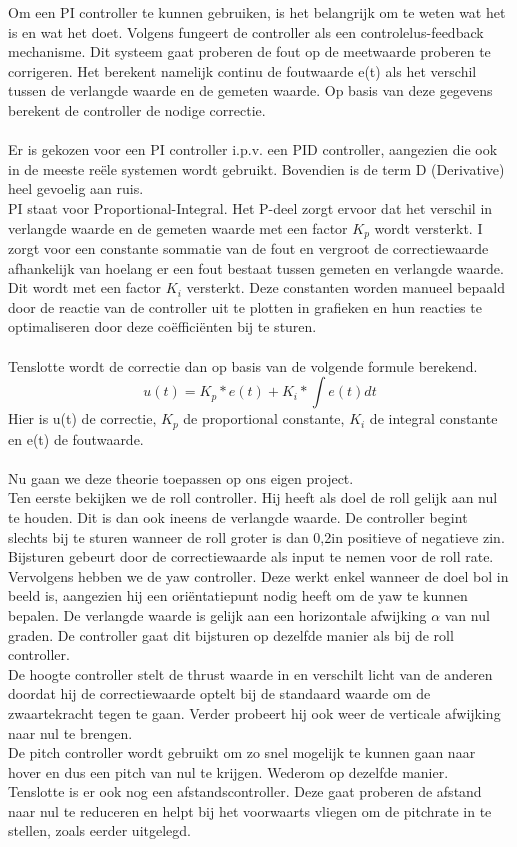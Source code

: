 \noindent
Om een PI controller te kunnen gebruiken, is het belangrijk om te weten wat het is en wat het doet. Volgens \cite{website:PIDController} fungeert de controller als een controlelus-feedback mechanisme. Dit systeem gaat proberen de fout op de meetwaarde proberen te corrigeren. Het berekent namelijk continu de foutwaarde e(t) als het verschil tussen de verlangde waarde en de gemeten waarde. Op basis van deze gegevens berekent de controller de nodige correctie. 
\\
\\
Er is gekozen voor een PI controller i.p.v. een PID controller, aangezien die ook in de meeste re\"ele systemen wordt gebruikt. Bovendien is de term D (Derivative) heel gevoelig aan ruis.
\\
PI staat voor Proportional-Integral. Het P-deel zorgt ervoor dat het verschil in verlangde waarde en de gemeten waarde met een factor $K_p$ wordt versterkt. 
I zorgt voor een constante sommatie van de fout en vergroot de correctiewaarde afhankelijk van hoelang er een fout bestaat tussen gemeten en verlangde waarde. Dit wordt met een factor $K_i$ versterkt. Deze constanten worden manueel bepaald door de reactie van de controller uit te plotten in grafieken en hun reacties te optimaliseren door deze co\"effici\"enten bij te sturen.
\\
\\
Tenslotte wordt de correctie dan op basis van de volgende formule berekend.
\begin{equation}
	u(t) = K_p * e(t) + K_i * \int e(t) dt
\end{equation}
Hier is u(t) de correctie, $K_p$ de proportional constante, $K_i$ de integral constante en e(t) de foutwaarde.
\\
\\
Nu gaan we deze theorie toepassen op ons eigen project.
\\
Ten eerste bekijken we de roll controller. Hij heeft als doel de roll gelijk aan nul te houden. Dit is dan ook ineens de verlangde waarde.  De controller begint slechts bij te sturen wanneer de roll groter is dan 0,2\degree  in positieve of negatieve zin. Bijsturen gebeurt door de correctiewaarde als input te nemen voor de roll rate.
\\
Vervolgens hebben we de yaw controller. Deze werkt enkel wanneer de doel bol in beeld is, aangezien hij een ori\"entatiepunt nodig heeft om de yaw te kunnen bepalen. De verlangde waarde is gelijk aan een horizontale afwijking $\alpha$ van nul graden. De controller gaat dit bijsturen op dezelfde manier als bij de roll controller.
\\
De hoogte controller stelt de thrust waarde in en verschilt licht van de anderen doordat hij de correctiewaarde optelt bij de standaard waarde om de zwaartekracht tegen te gaan. Verder probeert hij ook weer de verticale afwijking naar nul te brengen.
\\
De pitch controller wordt gebruikt om zo snel mogelijk te kunnen gaan naar hover en dus een pitch van nul te krijgen. Wederom op dezelfde manier.
\\
Tenslotte is er ook nog een afstandscontroller. Deze gaat proberen de afstand naar nul te reduceren en helpt bij het voorwaarts vliegen om de pitchrate in te stellen, zoals eerder uitgelegd.